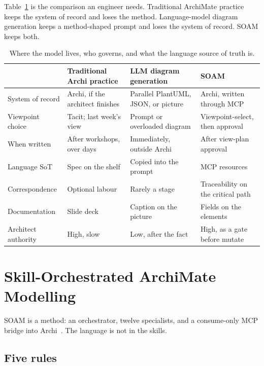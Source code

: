 \documentclass[10pt,journal,compsoc]{IEEEtran}
\begin{document}
Table~\ref{tab:compare} is the comparison an engineer needs. Traditional ArchiMate practice keeps the system of record and loses the method. Language-model diagram generation keeps a method-shaped prompt and loses the system of record. SOAM keeps both.

\begin{table}[!t]
\caption{Where the model lives, who governs, and what the language source of truth is.}
\label{tab:compare}
\centering
{\small
\begin{tabularx}{\textwidth}{@{}>{\raggedright\arraybackslash}p{} *{3}{>{\raggedright\arraybackslash}X}@{}}
\toprule
 & \textbf{Traditional Archi practice} & \textbf{LLM diagram generation} & \textbf{SOAM} \\
\midrule
System of record & Archi, if the architect finishes & Parallel PlantUML, JSON, or picture & Archi, written through MCP \\
Viewpoint choice & Tacit; last week's view & Prompt or overloaded diagram & Viewpoint-select, then approval \\
When written & After workshops, over days & Immediately, outside Archi & After view-plan approval \\
Language SoT & Spec on the shelf & Copied into the prompt & MCP resources \\
Correspondence & Optional labour & Rarely a stage & Traceability on the critical path \\
Documentation & Slide deck & Caption on the picture & Fields on the elements \\
Architect authority & High, slow & Low, after the fact & High, as a gate before mutate \\
\bottomrule
\end{tabularx}}
\end{table}

\section{Skill-Orchestrated ArchiMate Modelling}
\label{sec:method}

SOAM is a method: an orchestrator, twelve specialists, and a consume-only MCP bridge into Archi~\cite{jgsarchiskills,jgsarchibridge}. The language is not in the skills.

\subsection{Five rules}
\end{document}
